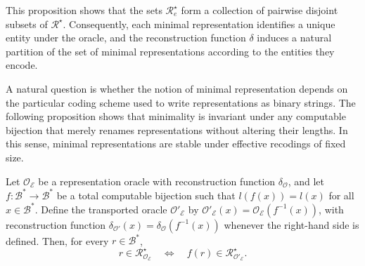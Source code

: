 This proposition shows that the sets $\mathcal{R}^\star_{e}$ form a collection of pairwise disjoint subsets of $\mathcal{R}^\star$. Consequently, each minimal representation identifies a unique entity under the oracle, and the reconstruction function $\delta$ induces a natural partition of the set of minimal representations according to the entities they encode.

A natural question is whether the notion of minimal representation depends on the particular coding scheme used to write representations as binary strings. The following proposition shows that minimality is invariant under any computable bijection that merely renames representations without altering their lengths. In this sense, minimal representations are stable under effective recodings of fixed size.

\begin{proposition}
Let $\mathcal{O}_{\mathcal{E}}$ be a representation oracle with reconstruction function $\delta_{\mathcal{O}}$, and let $f:\mathcal{B}^\ast \to \mathcal{B}^\ast$ be a total computable bijection such that $l(f(x)) = l(x)$ for all $x \in \mathcal{B}^\ast$. Define the transported oracle $\mathcal{O}'_{\mathcal{E}}$ by $\mathcal{O}'_{\mathcal{E}}(x) = \mathcal{O}_{\mathcal{E}}(f^{-1}(x))$, with reconstruction function $\delta_{\mathcal{O}'}(x)
= \delta_{\mathcal{O}}(f^{-1}(x))$ whenever the right-hand side is defined. Then, for every $r \in \mathcal{B}^\ast$,
\[
r \in \mathcal{R}^\star_{\mathcal{O}_{\mathcal{E}}}
\quad\Longleftrightarrow\quad
f(r) \in \mathcal{R}^\star_{\mathcal{O}'_{\mathcal{E}}}.
\]
\end{proposition}
